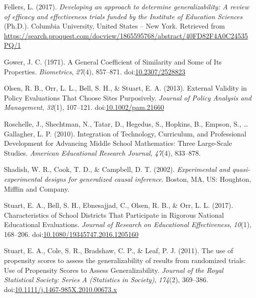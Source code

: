 \documentclass[man]{apa6}
\begin{document}
\begingroup
\setlength{\parindent}{-0.5in}
\setlength{\leftskip}{0.5in}

\hypertarget{refs}{}
\leavevmode\hypertarget{ref-fellersDevelopingApproachDetermine2017}{}%
Fellers, L. (2017). \emph{Developing an approach to determine generalizability: A review of efficacy and effectiveness trials funded by the Institute of Education Sciences} (Ph.D.). Columbia University, United States -- New York. Retrieved from \url{https://search.proquest.com/docview/1865595768/abstract/40FD82F4A0C24535PQ/1}

\leavevmode\hypertarget{ref-gowerGeneralCoefficientSimilarity1971}{}%
Gower, J. C. (1971). A General Coefficient of Similarity and Some of Its Properties. \emph{Biometrics}, \emph{27}(4), 857--871. doi:\href{https://doi.org/10.2307/2528823}{10.2307/2528823}

\leavevmode\hypertarget{ref-olsenExternalValidityPolicy2013}{}%
Olsen, R. B., Orr, L. L., Bell, S. H., \& Stuart, E. A. (2013). External Validity in Policy Evaluations That Choose Sites Purposively. \emph{Journal of Policy Analysis and Management}, \emph{32}(1), 107--121. doi:\href{https://doi.org/10.1002/pam.21660}{10.1002/pam.21660}

\leavevmode\hypertarget{ref-roschelleIntegrationTechnologyCurriculum2010}{}%
Roschelle, J., Shechtman, N., Tatar, D., Hegedus, S., Hopkins, B., Empson, S., \ldots{} Gallagher, L. P. (2010). Integration of Technology, Curriculum, and Professional Development for Advancing Middle School Mathematics: Three Large-Scale Studies. \emph{American Educational Research Journal}, \emph{47}(4), 833--878.

\leavevmode\hypertarget{ref-shadishExperimentalQuasiexperimentalDesigns2002}{}%
Shadish, W. R., Cook, T. D., \& Campbell, D. T. (2002). \emph{Experimental and quasi-experimental designs for generalized causal inference}. Boston, MA, US: Houghton, Mifflin and Company.

\leavevmode\hypertarget{ref-stuartCharacteristicsSchoolDistricts2017}{}%
Stuart, E. A., Bell, S. H., Ebnesajjad, C., Olsen, R. B., \& Orr, L. L. (2017). Characteristics of School Districts That Participate in Rigorous National Educational Evaluations. \emph{Journal of Research on Educational Effectiveness}, \emph{10}(1), 168--206. doi:\href{https://doi.org/10.1080/19345747.2016.1205160}{10.1080/19345747.2016.1205160}

\leavevmode\hypertarget{ref-stuartUsePropensityScores2011}{}%
Stuart, E. A., Cole, S. R., Bradshaw, C. P., \& Leaf, P. J. (2011). The use of propensity scores to assess the generalizability of results from randomized trials: Use of Propensity Scores to Assess Generalizability. \emph{Journal of the Royal Statistical Society: Series A (Statistics in Society)}, \emph{174}(2), 369--386. doi:\href{https://doi.org/10.1111/j.1467-985X.2010.00673.x}{10.1111/j.1467-985X.2010.00673.x}
\end{document}
